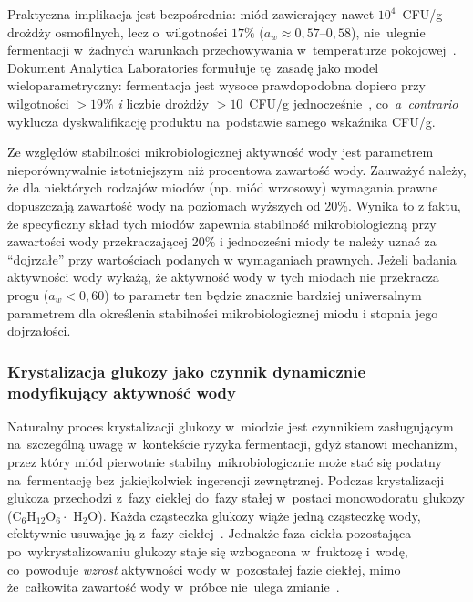 Praktyczna implikacja jest bezpośrednia: miód zawierający nawet
$10^4$~CFU/g drożdży osmofilnych, lecz o~wilgotności $17\%$
($a_w \approx 0{,}57$--$0{,}58$), nie~ulegnie fermentacji
w~żadnych warunkach przechowywania w~temperaturze pokojowej~\cite{alwaili2012}.
Dokument Analytica Laboratories formułuje tę~zasadę jako model
wieloparametryczny: fermentacja jest wysoce prawdopodobna dopiero
przy wilgotności $> 19\%$ \emph{i} liczbie drożdży $> 10$~CFU/g
jednocześnie~\cite{analytica2020}, co~\textit{a~contrario}
wyklucza dyskwalifikację produktu na~podstawie samego wskaźnika CFU/g.

Ze względów stabilności mikrobiologicznej aktywność wody jest parametrem nieporównywalnie istotniejszym niż procentowa zawartość wody. Zauważyć należy, że dla niektórych rodzajów miodów (np. miód wrzosowy) wymagania prawne dopuszczają zawartość wody na poziomach wyższych od 20\%. Wynika to z faktu, że specyficzny skład tych miodów zapewnia stabilność mikrobiologiczną przy zawartości wody przekraczającej 20\% i jednocześni miody te należy uznać za “dojrzałe” przy wartościach podanych w wymaganiach prawnych. Jeżeli badania aktywności wody wykażą, że aktywność wody w tych miodach nie przekracza progu ($a_w < 0{,}60$) to parametr ten będzie znacznie bardziej uniwersalnym parametrem dla określenia stabilności mikrobiologicznej miodu i stopnia jego dojrzałości. 

\subsubsection{Krystalizacja glukozy jako czynnik dynamicznie modyfikujący aktywność wody}

Naturalny proces krystalizacji glukozy w~miodzie jest czynnikiem
zasługującym na~szczególną uwagę w~kontekście ryzyka fermentacji,
gdyż stanowi mechanizm, przez który miód pierwotnie stabilny
mikrobiologicznie może stać się podatny na~fermentację bez~jakiejkolwiek
ingerencji zewnętrznej. Podczas krystalizacji glukoza przechodzi
z~fazy ciekłej do~fazy stałej w~postaci monowodoratu glukozy
(C$_6$H$_{12}$O$_6 \cdot$ H$_2$O). Każda cząsteczka glukozy
wiąże jedną cząsteczkę wody, efektywnie usuwając ją z~fazy
ciekłej~\cite{zamora2006}. Jednakże faza ciekła
pozostająca po~wykrystalizowaniu glukozy staje się wzbogacona
w~fruktozę i~wodę, co~powoduje \emph{wzrost} aktywności wody
w~pozostałej fazie ciekłej, mimo że~całkowita zawartość wody
w~próbce nie~ulega zmianie~\cite{zamora2006,ijfans2019}.

